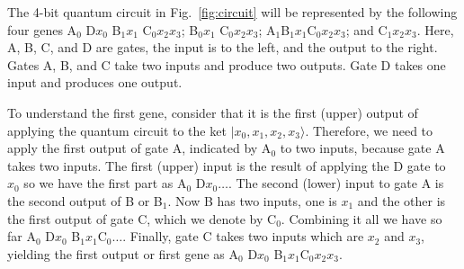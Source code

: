 \documentclass{article}
\begin{document}
\begin{figure}[h]
\end{figure}

The 4-bit quantum circuit in Fig.~\ref{fig:circuit} will be represented
by the following four genes A$_0$ D$x_0$  B$_1x_1$ C$_0x_2x_3$;
 B$_0x_1$ C$_0x_2x_3$; A$_1$B$_1x_1$C$_0x_2 x_3$; and C$_1x_2x_3$.
Here, A, B, C, and D are gates, the input is to the left, and the output to the right.
Gates A, B, and C take two inputs and produce two outputs. Gate D takes one input and produces one output.

To understand the first gene, consider that it is the first (upper) output of applying
the quantum circuit to the ket $|x_0, x_1, x_2, x_3\rangle$. Therefore, we need
to apply the first output of gate A, indicated by A$_0$ to two inputs, because
gate A takes two inputs. The first (upper) input is the result of applying the D gate
to $x_0$ so we have the first part as A$_0$ D$x_0\ldots$. The second (lower) input to gate
A is the second output of B or B$_1$. Now B has two inputs, one is $x_1$ and the other is
the first output of gate C, which we denote by C$_0$. Combining it all we have so far
A$_0$ D$x_0$ B$_1x_1$C$_0\ldots$. Finally, gate C takes two inputs which are $x_2$ and $x_3$,
yielding the first output or first gene as A$_0$ D$x_0$ B$_1x_1$C$_0x_2x_3$.
\end{document}
